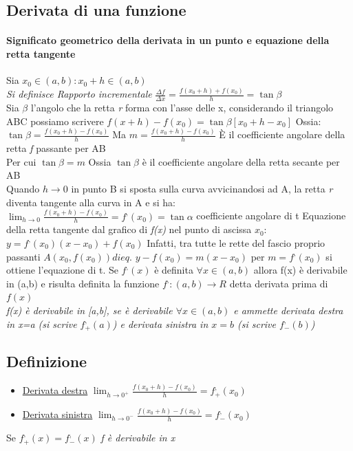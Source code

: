 \subsection{Derivata di una funzione}
\paragraph{Significato geometrico della derivata in un punto e equazione della
retta tangente}
Sia $x_0\in (a,b): x_0+h\in (a,b)$\\
\textit{Si definisce Rapporto incrementale} $\frac{\Delta f}{\Delta x}
=\frac{f(x_0+h)+f(x_0)}{h}=\tan \beta$\\
Sia $\beta$ l'angolo che la retta \textit{r} forma con l'asse delle x,
considerando il triangolo ABC possiamo scrivere $f(x+h)-f(x_0) = \tan\beta
[x_0+h-x_0]$ Ossia: $\tan\beta=\frac{f(x_0+h)-f(x_0)}{h}$
Ma $m=\frac{f(x_0+h)-f(x_0)}{h}$ È il coefficiente angolare della retta
\textit{f} passante per AB\\
Per cui $\tan\beta=m$
Ossia $\tan \beta$ è il coefficiente angolare della retta secante per AB\\
Quando $h\to 0$ in punto B si sposta sulla curva avvicinandosi ad A, la retta
\textit{r} diventa tangente alla curva in A e si ha: $\lim_{h\to 0}
\frac{f(x_0+h)-f(x_0)}{h}=f^,(x_0)=\tan \alpha$ coefficiente angolare di t
Equazione della retta tangente dal grafico di \textit{f(x)} nel punto di
ascissa $x_0$: $y=f^,(x_0)(x-x_0)+f(x_0)$ Infatti, tra tutte le rette del
fascio proprio passanti $A(x_0,f(x_0)) di eq.$ $y-f(x_0)=m(x-x_0)$ per $
m=f^,(x_0)$ si ottiene l'equazione di t.
Se $f^,(x)$ è definita $\forall x \in (a,b)$ allora f(x) è derivabile in (a,b)
e risulta definita la funzione $f^,:(a,b)\to R$ detta derivata prima di
$f(x)$\\
\textit{f(x) è derivabile in [a,b], se è derivabile $\forall x \in (a,b)$ e
ammette derivata destra in x=a (si scrive $f^,_+(a)$) e derivata sinistra in
$x=b$ (si scrive $f^,_-(b)$)}
\subsection{Definizione}
\begin{itemize}
	\item \underline{Derivata destra} $\lim_{h\to 0^+}\frac{f(x_0+h)-f(x_0)}{h}
		= f^,_+(x_0)$
	\item \underline{Derivata sinistra} $\lim_{h\to 0^-}\frac{f(x_0+h)-f(x_0)}{h}
		= f^,_-(x_0)$
\end{itemize}
Se $f^,_+(x)=f^,_-(x)$ \textit{f è derivabile in x}
